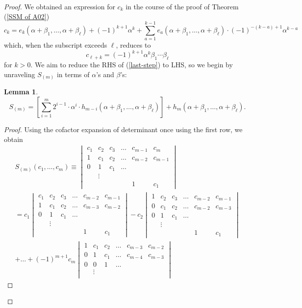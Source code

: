 \documentclass[11pt]{article}
\theoremstyle{plain}
\newtheorem{lemma}[fact]{Lemma}
\theoremstyle{definition}
\theoremstyle{definition}
\begin{document}
\begin{proof}
We obtained an expression for $c_k$ in the course of the proof of Theorem (\ref{SSM of A02})
\[
c_k=e_k(\alpha+\beta_1,\dots,\alpha+\beta_\ell) + (-1)^{k+1}\alpha^k+\sum_{a=1}^{k-1 } e_a(\alpha+\beta_1,\dots,\alpha+\beta_\ell)\cdot (-1)^{-(k-a)+1}\alpha^{k-a} 
\]
which, when the subscript exceeds $\ell$, reduces to 
\[
c_{\ell+k} = (-1)^{k+1}\alpha^k\beta_1\cdots\beta_\ell
\]
for $k>0$. We aim to reduce the RHS of (\ref{last-step}) to LHS, so we begin by unraveling $S_{(m)}$ in terms of $\alpha$'s and $\beta$'s:

\begin{lemma}\label{Sm determinant}
\[
S_{(m)}=\left[\sum_{i=1}^{m}2^{i-1}\cdot \alpha^i\cdot h_{m-i}(\alpha+\beta_1,\dots,\alpha+\beta_\ell)\right] + h_{m}(\alpha+\beta_1,\dots,\alpha+\beta_\ell).
\]
\end{lemma}
\begin{proof}
Using the cofactor expansion of determinant once using the first row, we obtain 
\begin{gather*}
S_{(m)}(c_1,\dots,c_m) \equiv \begin{vmatrix}c_1 & c_2 & c_3&\dots&c_{m-1} & c_{m}\\ 1 & c_1 &c_2& \dots&c_{m-2} & c_{m-1}\\0&1&c_1&\dots\\ & \vdots & \\
&&&&1&c_1\end{vmatrix}\\
=c_1\begin{vmatrix}c_1 & c_2 &c_3& \dots&c_{m-2} & c_{m-1}\\ 1 & c_1 & c_2&\dots&c_{m-3} & c_{m-2}\\0&1&c_1&\dots\\ & \vdots & \\
&&&&1&c_1\end{vmatrix}-c_2\begin{vmatrix}1 & c_2 & c_3 &\dots&c_{m-2} & c_{m-1}\\ 0& c_1 & c_2 & \dots&c_{m-2} & c_{m-3}\\0&1&c_1&\dots\\ & \vdots & \\
&&&&1&c_1\end{vmatrix} \\
+ \dots + (-1)^{m+1}c_m\begin{vmatrix}1 & c_1 & c_2 &\dots&c_{m-3} & c_{m-2}\\ 0& 1 & c_1 & \dots&c_{m-4} & c_{m-3}\\0&0&1&\dots\\ & \vdots & \\

\end{vmatrix}
\end{gather*}
\end{proof}
\end{proof}
\end{document}
